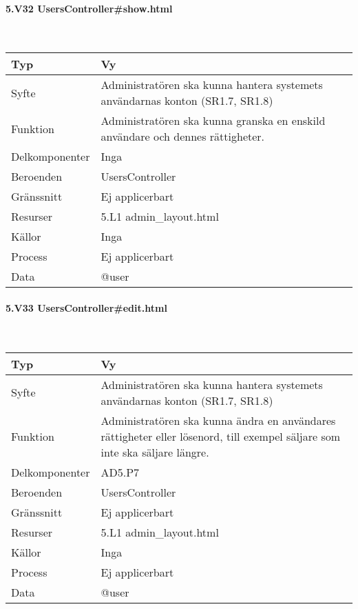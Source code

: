 \documentclass[a4paper, twoside, 11pt, titlepage]{article}
\begin{document}
			\paragraph{5.V32 UsersController\#show.html}\

			\begin {table} [ht] \begin{tabular} {  p{3.5cm} p{9.6cm} }
				\hline
				{Typ} & {Vy} \\
				\hline
				{Syfte} & {Administratören ska kunna hantera systemets användarnas konton (SR1.7, SR1.8)} \\
				\hline
				{Funktion} & {Administratören ska kunna granska en enskild användare och dennes rättigheter.} \\
				\hline
				{Delkomponenter} & {Inga} \\
				\hline
				{Beroenden} & {UsersController} \\
				\hline
				{Gränssnitt} & {Ej applicerbart} \\
				\hline
				{Resurser} & {5.L1 admin\_layout.html} \\
				\hline
				{Källor} & {Inga} \\
				\hline
				{Process} & {Ej applicerbart} \\
				\hline
				{Data} & {@user} \\
				\hline
			\end{tabular} \end{table} \FloatBarrier


			\paragraph{5.V33 UsersController\#edit.html}\

			\begin {table} [ht] \begin{tabular} {  p{3.5cm} p{9.6cm} }
				\hline
				{Typ} & {Vy} \\
				\hline
				{Syfte} & {Administratören ska kunna hantera systemets användarnas konton (SR1.7, SR1.8)} \\
				\hline
				{Funktion} & {Administratören ska kunna ändra en användares rättigheter eller lösenord, till exempel säljare som inte ska säljare längre.} \\
				\hline
				{Delkomponenter} & {AD5.P7} \\
				\hline
				{Beroenden} & {UsersController} \\
				\hline
				{Gränssnitt} & {Ej applicerbart} \\
				\hline
				{Resurser} & {5.L1 admin\_layout.html} \\
				\hline
				{Källor} & {Inga} \\
				\hline
				{Process} & {Ej applicerbart} \\
				\hline
				{Data} & {@user} \\
				\hline
			\end{tabular} \end{table} \FloatBarrier
\end{document}
